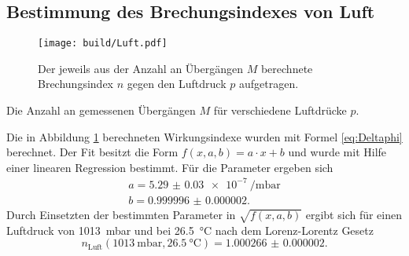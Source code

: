\subsection{Bestimmung des Brechungsindexes von Luft}

\begin{figure}
	\centering
	\texttt{[image: build/Luft.pdf]}
	\caption{Der jeweils aus der Anzahl an Übergängen $M$ berechnete Brechungsindex $n$ gegen den Luftdruck $p$ aufgetragen.}
	\label{fig:Luft}
\end{figure}
\begin{table}
	\centering
	\caption{Die Anzahl an gemessenen Übergängen $M$ für verschiedene Luftdrücke $p$.}
	
\end{table}
Die in Abbildung \ref{fig:Luft} berechneten Wirkungsindexe wurden mit Formel \eqref{eq:Deltaphi} berechnet. Der Fit besitzt die Form $f(x,a,b) =a\cdot x +b$ und wurde mit Hilfe einer linearen Regression bestimmt. Für die Parameter ergeben sich
\begin{gather*}
	a=\SI{5.29(3)e-7}{\per\milli\bar}\\
	b=\num{0.999996(2)}.
\end{gather*}
Durch Einsetzten der bestimmten Parameter in $\sqrt{f(x,a,b)}$ ergibt sich für einen Luftdruck von \SI{1013}{\milli\bar} und bei \SI{26.5}{\degreeCelsius} nach dem Lorenz-Lorentz Gesetz
\begin{displaymath}
 n_\text{Luft}(\SI{1013}{\milli\bar},\SI{26.5}{\degreeCelsius})=\num{1.000266(2)}.
\end{displaymath}